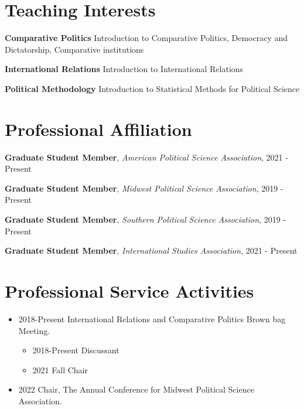 \documentclass[margin,line]{res}
\begin{document}
\begin{resume}
\section{\sc Teaching Interests}

{\bf Comparative Politics} Introduction to Comparative Politics, Democracy and Dictatorship, Comparative institutions
\vspace{-.25cm}

{\bf International Relations} Introduction to International Relations
\vspace{-.25cm}

{\bf Political Methodology} Introduction to Statistical Methods for Political Science
\vspace{-.25cm}

\section{\sc Professional Affiliation}

{\bf Graduate Student Member}, {\it American Political Science Association}, 2021 - Present
\vspace{-.25cm}

{\bf Graduate Student Member}, {\it Midwest Political Science Association}, 2019 - Present
\vspace{-.25cm}

{\bf Graduate Student Member}, {\it Southern Political Science Association}, 2019 - Present
\vspace{-.25cm}

{\bf Graduate Student Member}, {\it International Studies Association}, 2021 - Present

\section{\sc Professional Service Activities}
\vspace{-.3cm}
\begin{itemize} \itemsep -0.3mm 
	\item[] 2018-Present International Relations and Comparative Politics Brown bag Meeting.
	\begin{itemize}
		\item[] 2018-Present Discussant
		\item[] 2021 Fall Chair
	\end{itemize}
	\item[] 2022 Chair, The Annual Conference for Midwest Political Science Association.
\end{itemize}


\end{resume}
\end{document}
